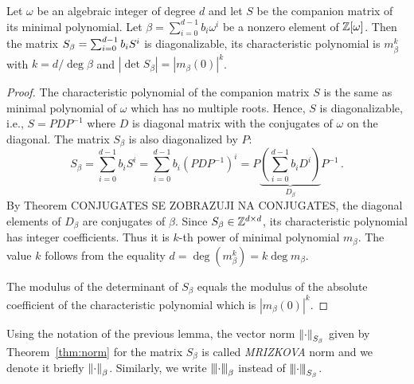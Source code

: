 \begin{lem}
Let $\omega$ be an algebraic integer of degree $d$ and let $S$ be the companion matrix of its minimal polynomial. Let $\beta=\sum_{i=0}^{d-1} b_i \omega^i$ be a nonzero element of $\mathbb{Z}[\omega]$. Then the matrix $S_\beta=\sum_{i=0}^{d-1} {b}_i S^i$ is diagonalizable, its characteristic polynomial is $m_\beta^k$ with $k=d / \deg \beta$ and $|\det S_\beta|=|m_\beta(0)|^k$.  
\end{lem}
\begin{proof}
The characteristic polynomial of the companion matrix $S$ is the same as minimal polynomial of $\omega$ which has no multiple roots. Hence, $S$ is diagonalizable, i.e., $S=PDP^{-1}$ where $D$ is diagonal matrix with the conjugates of $\omega$ on the diagonal. The matrix $S_\beta$ is also diagonalized by $P$:
$$
S_\beta=\sum_{i=0}^{d-1} b_i S^i= \sum_{i=0}^{d-1} b_i \left(PDP^{-1}\right)^i=P\underbrace{\left(\sum_{i=0}^{d-1} b_i D^i\right)}_{D_\beta}P^{-1}\,.
$$
By Theorem CONJUGATES SE ZOBRAZUJI NA CONJUGATES, the diagonal elements of $D_\beta$ are conjugates of $\beta$. Since $S_\beta\in\mathbb{Z}^{d\times d}$, its characteristic polynomial has integer coefficients. Thus it is $k$-th power of minimal polynomial $m_\beta$. The value $k$ follows from the equality $d=\deg(m_\beta^k)=k \deg m_\beta$. 

The modulus of the determinant of $S_\beta$ equals the modulus of the absolute coefficient of the characteristic polynomial which is $|m_\beta(0)|^k$.

\end{proof}

\begin{defn}
Using the notation of the previous lemma, the vector norm $\left\lVert\cdot\right\rVert_{S_\beta}$ given by Theorem~\ref{thm:norm} for the matrix $S_\beta$ is called \emph{MRIZKOVA} norm and we denote it briefly $\left\lVert\cdot\right\rVert_{\beta}$. Similarly, we write ${\left\vert\kern-0.25ex\left\vert\kern-0.25ex\left\vert \cdot\right\vert\kern-0.25ex\right\vert\kern-0.25ex\right\vert}_{\beta}$  instead of ${\left\vert\kern-0.25ex\left\vert\kern-0.25ex\left\vert \cdot\right\vert\kern-0.25ex\right\vert\kern-0.25ex\right\vert}_{S_\beta}$.
\end{defn}
